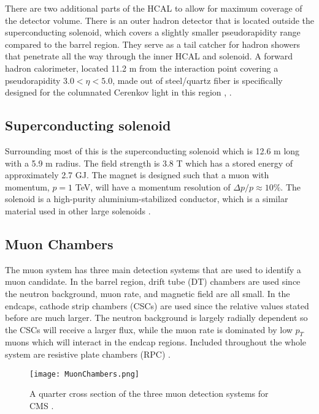 There are two additional parts of the HCAL to allow for maximum coverage of the detector volume. There is an outer hadron detector that is located outside the superconducting solenoid, which covers a slightly smaller pseudorapidity range compared to the barrel region. They serve as a tail catcher for hadron showers that penetrate all the way through the inner HCAL and solenoid. A forward hadron calorimeter, located 11.2 m from the interaction point covering a pseudorapidity $3.0<\eta<5.0$, made out of steel/quartz fiber is specifically designed for the columnated Cerenkov light in this region \cite{noauthor_cms_1997-1}, \cite{collaboration_cms_2007}. 

\subsection{Superconducting solenoid}
\label{sec:Solenoid}

Surrounding most of this is the superconducting solenoid which is 12.6 m long with a 5.9 m radius. The field strength is 3.8 T which has a stored energy of approximately 2.7 GJ. The magnet is designed such that a muon with momentum, $p=1$ TeV, will have a momentum resolution of $\Delta p/p\approx10\%$. The solenoid is a high-purity aluminium-stabilized conductor, which is a similar material used in other large solenoids \cite{collaboration_cms_2007}. 

\subsection{Muon Chambers}
\label{sec:muCham}

The muon system has three main detection systems that are used to identify a muon candidate. In the barrel region, drift tube (DT) chambers are used since the neutron background, muon rate, and magnetic field are all small. In the endcaps, cathode strip chambers (CSCs) are used since the relative values stated before are much larger. The neutron background is largely radially dependent so the CSCs will receive a larger flux, while the muon rate is dominated by low $p_T$ muons which will interact in the endcap regions. Included throughout the whole system are resistive plate chambers (RPC) \cite{collaboration_cms_2007}. 

\begin{figure}
 	\centering
	\texttt{[image: MuonChambers.png]}
 	\caption[Muon Chambers]{A quarter cross section of the three muon detection systems for CMS \cite{collaboration_cms_2007}.}
 	\label{MuonChambers} 
\end{figure}

